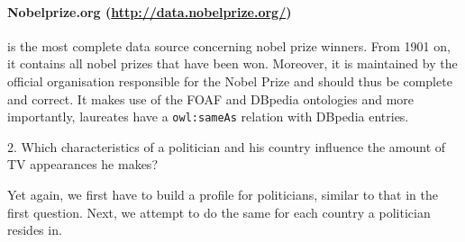 \documentclass[12pt,a4paper]{article}
\begin{document}
\paragraph{\textbf{Nobelprize.org} (\url{http://data.nobelprize.org/})} is the most complete data source concerning nobel prize winners. From 1901 on, it contains all nobel prizes that have been won. Moreover, it is maintained by the official organisation responsible for the Nobel Prize and should thus be complete and correct. It makes use of the FOAF and DBpedia ontologies and more importantly, laureates have a \texttt{owl:sameAs} relation with DBpedia entries.
\vspace{1cm}

\begin{center}
	\Large
2. Which characteristics of a politician and his country influence the amount of TV appearances he makes?
\end{center}
Yet again, we first have to build a profile for politicians, similar to that in the first question. Next, we attempt to do the same for each country a politician resides in.
\end{document}

